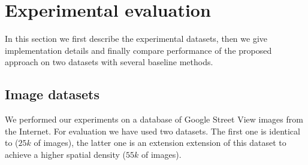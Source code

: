 \documentclass[table]{article} %
\begin{document}







\section{Experimental evaluation}
\label{sec:exp}
	In this section we first describe the experimental datasets, then we give implementation details and finally compare performance of the proposed approach on two datasets with several baseline methods.

   	\subsection{Image datasets}
		We performed our experiments on a database of Google Street View images from the Internet. For evaluation we have used two datasets. The first one is identical to \cite{Gronat2013, Torii2011} ($25k$ of images), the latter one is an extension extension of this dataset to achieve a higher spatial density ($55k$ of images).
\end{document}
